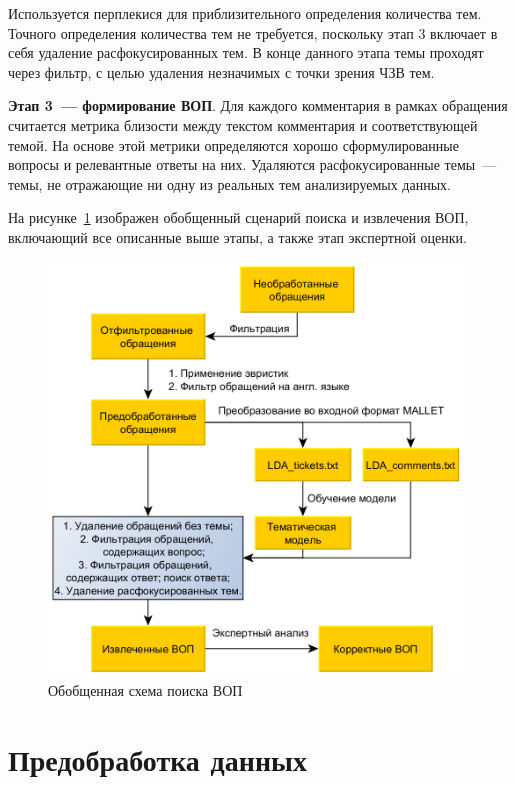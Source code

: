 Используется перплекися для приблизительного определения количества тем. Точного определения количества тем не требуется, поскольку этап 3 включает в себя удаление расфокусированных тем. В конце данного этапа темы проходят через фильтр, с целью удаления незначимых с точки зрения ЧЗВ тем.

\textbf{Этап 3~--- формирование ВОП}. Для каждого комментария в рамках обращения считается метрика близости между текстом комментария и соответствующей темой. На основе этой метрики определяются хорошо сформулированные вопросы и релевантные ответы на них. Удаляются расфокусированные темы~--- темы, не отражающие ни одну из реальных тем анализируемых данных.

На рисунке~\ref{fig:common_scheme} изображен обобщенный сценарий поиска и извлечения ВОП, включающий все описанные выше этапы, а также этап экспертной оценки.

\begin{figure}[tph!]
\centerline{\includegraphics[width=11cm]{fig/schema2_rus.png}}
    \caption{Обобщенная схема поиска ВОП}
    \label{fig:common_scheme}
\end{figure}

\section{Предобработка данных}
\label{sec:dev}

